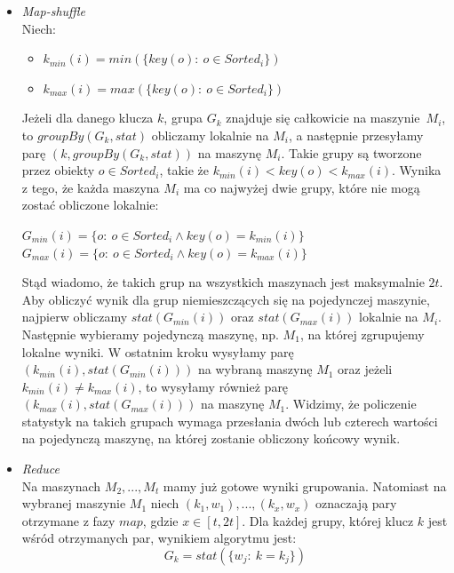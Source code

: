 \documentclass[magisterska]{pracamgr}
\begin{document}
\begin{itemize}
    \item \textit{Map-shuffle} \\
    Niech:
    \begin{itemize}
        \item \(k_{min}(i) = min(\{key(o) : \ o \in Sorted_i \})\)
        \item \(k_{max}(i) = max(\{key(o) : \ o \in Sorted_i \})\)
    \end{itemize}
    
    Jeżeli dla danego klucza \(k\), grupa \(G_{k}\) znajduje się całkowicie na \mbox{maszynie \(M_i\)}, to \(groupBy(G_{k}, stat)\) obliczamy lokalnie na  \(M_i\), a następnie przesyłamy parę \((k, groupBy(G_{k}, stat))\) na maszynę \(M_i\). Takie grupy są tworzone przez obiekty \mbox{\(o \in Sorted_i\)}, takie że \(k_{min}(i) < key(o) < k_{max}(i)\). Wynika z tego, że każda maszyna \(M_i\) ma co najwyżej dwie grupy, które nie mogą zostać obliczone lokalnie:
    \begin{center}
    \(G_{min}(i) = \{o : \ o \in Sorted_i \wedge key(o) = k_{min}(i)\}\) \\
    \(G_{max}(i) = \{o : \ o \in Sorted_i \wedge key(o) = k_{max}(i)\}\) \\
    \end{center}
    
    Stąd wiadomo, że takich grup na wszystkich maszynach jest maksymalnie \(2t\). Aby obliczyć wynik dla grup niemieszczących się na pojedynczej maszynie, najpierw obliczamy \(stat(G_{min}(i))\) oraz \(stat(G_{max}(i))\) lokalnie na \(M_i\). Następnie wybieramy pojedynczą maszynę, np. \(M_1\), na której zgrupujemy lokalne wyniki. W ostatnim kroku wysyłamy parę \((k_{min}(i), stat(G_{min}(i)))\) na wybraną maszynę \(M_1\) oraz jeżeli \(k_{min}(i) \neq k_{max}(i)\), to wysyłamy również parę \((k_{max}(i), stat(G_{max}(i)))\) na maszynę \(M_1\). Widzimy, że policzenie statystyk na takich grupach wymaga przesłania dwóch lub czterech wartości na pojedynczą maszynę, na której zostanie obliczony końcowy wynik.

    \item \textit{Reduce} \\
    Na maszynach \(M_2, ..., M_t\) mamy już gotowe wyniki grupowania. Natomiast na wybranej maszynie \(M_1\) niech \((k_1, w_1), ..., (k_x, w_x)\) oznaczają pary otrzymane z fazy \(map\), gdzie \(x \in [t, 2t]\). Dla każdej grupy, której klucz \(k\) jest wśród otrzymanych par, wynikiem algorytmu jest:\\
            $$G_k = stat(\{w_j: \ k = k_j\})$$
\end{itemize}
\end{document}
